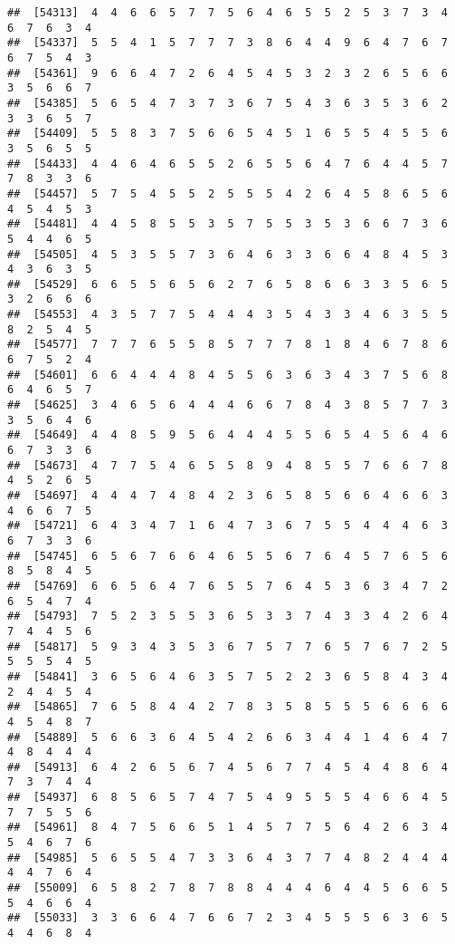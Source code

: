 \documentclass[
]{book}
\begin{document}
\begin{verbatim}
##  [54313]  4  4  6  6  5  7  7  5  6  4  6  5  5  2  5  3  7  3  4  6  7  6  3  4
##  [54337]  5  5  4  1  5  7  7  7  3  8  6  4  4  9  6  4  7  6  7  6  7  5  4  3
##  [54361]  9  6  6  4  7  2  6  4  5  4  5  3  2  3  2  6  5  6  6  3  5  6  6  7
##  [54385]  5  6  5  4  7  3  7  3  6  7  5  4  3  6  3  5  3  6  2  3  3  6  5  7
##  [54409]  5  5  8  3  7  5  6  6  5  4  5  1  6  5  5  4  5  5  6  3  5  6  5  5
##  [54433]  4  4  6  4  6  5  5  2  6  5  5  6  4  7  6  4  4  5  7  7  8  3  3  6
##  [54457]  5  7  5  4  5  5  2  5  5  5  4  2  6  4  5  8  6  5  6  4  5  4  5  3
##  [54481]  4  4  5  8  5  5  3  5  7  5  5  3  5  3  6  6  7  3  6  5  4  4  6  5
##  [54505]  4  5  3  5  5  7  3  6  4  6  3  3  6  6  4  8  4  5  3  4  3  6  3  5
##  [54529]  6  6  5  5  6  5  6  2  7  6  5  8  6  6  3  3  5  6  5  3  2  6  6  6
##  [54553]  4  3  5  7  7  5  4  4  4  3  5  4  3  3  4  6  3  5  5  8  2  5  4  5
##  [54577]  7  7  7  6  5  5  8  5  7  7  7  8  1  8  4  6  7  8  6  6  7  5  2  4
##  [54601]  6  6  4  4  4  8  4  5  5  6  3  6  3  4  3  7  5  6  8  6  4  6  5  7
##  [54625]  3  4  6  5  6  4  4  4  6  6  7  8  4  3  8  5  7  7  3  3  5  6  4  6
##  [54649]  4  4  8  5  9  5  6  4  4  4  5  5  6  5  4  5  6  4  6  6  7  3  3  6
##  [54673]  4  7  7  5  4  6  5  5  8  9  4  8  5  5  7  6  6  7  8  4  5  2  6  5
##  [54697]  4  4  4  7  4  8  4  2  3  6  5  8  5  6  6  4  6  6  3  4  6  6  7  5
##  [54721]  6  4  3  4  7  1  6  4  7  3  6  7  5  5  4  4  4  6  3  6  7  3  3  6
##  [54745]  6  5  6  7  6  6  4  6  5  5  6  7  6  4  5  7  6  5  6  8  5  8  4  5
##  [54769]  6  6  5  6  4  7  6  5  5  7  6  4  5  3  6  3  4  7  2  6  5  4  7  4
##  [54793]  7  5  2  3  5  5  3  6  5  3  3  7  4  3  3  4  2  6  4  7  4  4  5  6
##  [54817]  5  9  3  4  3  5  3  6  7  5  7  7  6  5  7  6  7  2  5  5  5  5  4  5
##  [54841]  3  6  5  6  4  6  3  5  7  5  2  2  3  6  5  8  4  3  4  2  4  4  5  4
##  [54865]  7  6  5  8  4  4  2  7  8  3  5  8  5  5  5  6  6  6  6  4  5  4  8  7
##  [54889]  5  6  6  3  6  4  5  4  2  6  6  3  4  4  1  4  6  4  7  4  8  4  4  4
##  [54913]  6  4  2  6  5  6  7  4  5  6  7  7  4  5  4  4  8  6  4  7  3  7  4  4
##  [54937]  6  8  5  6  5  7  4  7  5  4  9  5  5  5  4  6  6  4  5  7  7  5  5  6
##  [54961]  8  4  7  5  6  6  5  1  4  5  7  7  5  6  4  2  6  3  4  5  4  6  7  6
##  [54985]  5  6  5  5  4  7  3  3  6  4  3  7  7  4  8  2  4  4  4  4  4  7  6  4
##  [55009]  6  5  8  2  7  8  7  8  8  4  4  4  6  4  4  5  6  6  5  5  4  6  6  4
##  [55033]  3  3  6  6  4  7  6  6  7  2  3  4  5  5  5  6  3  6  5  4  4  6  8  4

\end{verbatim}
\end{document}

